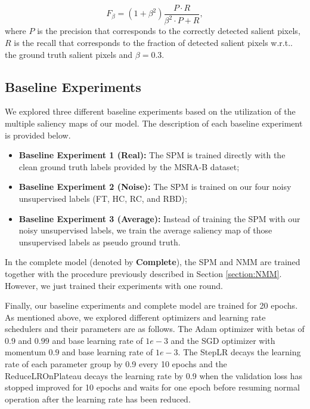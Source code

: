 \documentclass{article}
\makeatletter
\DeclareRobustCommand\onedot{\futurelet\@let@token\@onedot}
\def\@onedot{\ifx\@let@token.\else.\null\fi\xspace}
\def\wrt{w.r.t\onedot} \def\dof{d.o.f\onedot}
\makeatother
\begin{document}
\begin{equation}
  F_\beta = (1 + \beta^2) \dfrac{P \cdot R}{\beta^2 \cdot P + R},
  \label{eq:fmeasure}
\end{equation}
where $P$ is the precision that corresponds to the correctly detected salient pixels, $R$ is the recall that corresponds to the fraction of detected salient pixels \wrt the ground truth salient pixels and $\beta = 0.3$.

\subsection{Baseline Experiments}

We explored three different baseline experiments based on the utilization of the multiple saliency maps of our model. The description of each baseline experiment is provided below.

\begin{itemize}
  \item \textbf{Baseline Experiment 1 (Real):} The SPM is trained directly with the clean ground truth labels provided by the MSRA-B dataset;
  \item \textbf{Baseline Experiment 2 (Noise):} The SPM is trained on our four noisy unsupervised labels (FT, HC, RC, and RBD);
  \item \textbf{Baseline Experiment 3 (Average):} Instead of training the SPM with our noisy unsupervised labels, we train the average saliency map of those unsupervised labels as pseudo ground truth.
\end{itemize}

In the complete model (denoted by \textbf{Complete}), the SPM and NMM are trained together with the procedure previously described in Section \ref{section:NMM}. However, we just trained their experiments with one round.

Finally, our baseline experiments and complete model are trained for 20 epochs. As mentioned above, we explored different optimizers and learning rate schedulers and their parameters are as follows. The Adam optimizer with betas of $0.9$ and $0.99$ and base learning rate of $1e-3$ and the SGD optimizer with momentum $0.9$ and base learning rate of $1e-3$. The StepLR decays the learning rate of each parameter group by 0.9 every 10 epochs and the ReduceLROnPlateau decays the learning rate by 0.9 when the validation loss has stopped improved for 10 epochs and waits for one epoch before resuming normal operation after the learning rate has been reduced.
\end{document}
